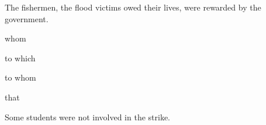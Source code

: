 \iffalse
\chapter{2019}
\author{ai24btech11035}
\section{st}
\fi
\item The fishermen, \underline{\hspace{1cm}} the flood victims owed their lives, were rewarded by the government.
\begin{enumerate}
\begin{multicols}{4}
\item whom
\item to which
\item to whom
\item that
\end{multicols}
\end{enumerate}
\item Some students were not involved in the strike.


